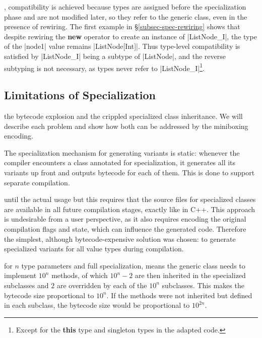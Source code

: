 , compatibility is achieved because types are assigned before the specialization phase and are not modified later, so they refer to the generic class, even in the presence of rewiring. The first example in \S\ref{subsec-spec-rewiring} shows that despite rewiring the {\bf new} operator to create an instance of |ListNode_I|, the type of the |node1| value remains |ListNode[Int]|. Thus type-level compatibility is satisfied by |ListNode_I| being a subtype of |ListNode|, and the reverse subtyping is not necessary, as types never refer to |ListNode_I|\footnote{Except for the {\bf this} type and singleton types in the adapted code.}.

\subsection{Limitations of Specialization}
\label{subsec-spec-limits}

 the bytecode explosion and the crippled specialized class inheritance. We will describe each problem and show how both can be addressed by the miniboxing encoding.     

The specialization mechanism for generating variants is static: whenever the compiler encounters a class annotated for specialization, it generates all its variants up front and outputs bytecode for each of them. This is done to support separate compilation.

 until the actual usage but this requires that the source files for specialized classes are available in all future compilation stages, exactly like in C++. This approach is undesirable from a user perspective, as it also requires encoding the original compilation flags and state, which can influence the generated code. Therefore the simplest, although bytecode-expensive solution was chosen: to generate specialized variants for all value types during compilation.

 for $n$ type parameters and full specialization, means the generic class needs to implement $10^n$ methods, of which $10^n - 2$ are then inherited in the specialized subclasses and $2$ are overridden by each of the $10^n$ subclasses. This makes the bytecode size proportional to $10^n$. If the methods were not inherited but defined in each subclass, the bytecode size would be proportional to $10^{2n}$.

